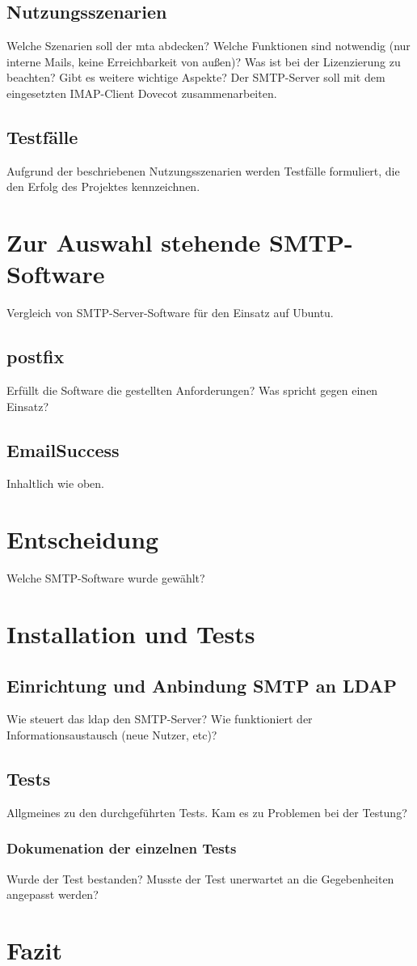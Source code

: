 \section{Nutzungsszenarien}
Welche Szenarien soll der \ac{mta} abdecken? Welche Funktionen sind notwendig (\zb nur interne Mails, keine Erreichbarkeit von außen)? Was ist bei der Lizenzierung zu beachten? Gibt es weitere wichtige Aspekte? Der SMTP-Server soll mit dem eingesetzten IMAP-Client Dovecot zusammenarbeiten.
\section{Testfälle}
Aufgrund der beschriebenen Nutzungsszenarien werden Testfälle formuliert, die den Erfolg des Projektes kennzeichnen. 

\chapter{Zur Auswahl stehende SMTP-Software}
Vergleich von SMTP-Server-Software für den Einsatz auf Ubuntu. 
\section{postfix}
Erfüllt die Software die gestellten Anforderungen? Was spricht gegen einen Einsatz?
\section{EmailSuccess}
Inhaltlich wie oben.

\chapter{Entscheidung}
Welche SMTP-Software wurde gewählt? 

\chapter{Installation und Tests}

\section{Einrichtung und Anbindung SMTP an LDAP}
Wie steuert das \ac{ldap} den SMTP-Server? Wie funktioniert der Informationsaustausch (neue Nutzer, etc)?

\section{Tests}
Allgmeines zu den durchgeführten Tests. Kam es zu Problemen bei der Testung?
\subsection{Dokumenation der einzelnen Tests}
Wurde der Test bestanden? Musste der Test unerwartet an die Gegebenheiten angepasst werden?

\chapter{Fazit}

\blindtext


